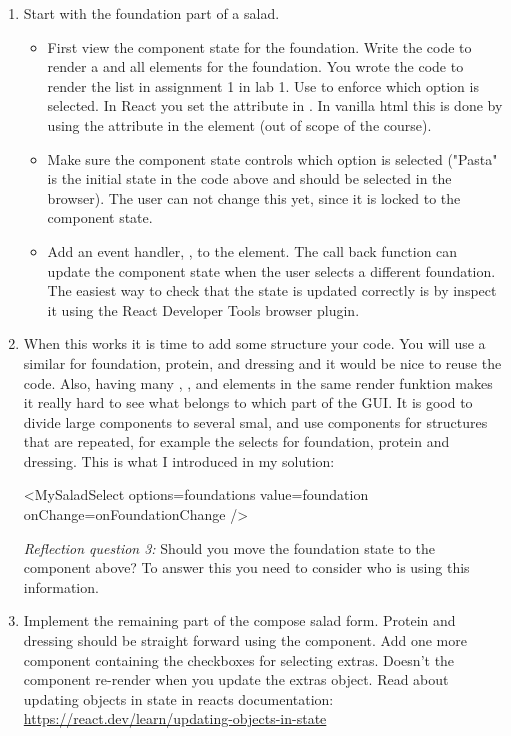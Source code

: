 \documentclass[fleqn, article, a4paper]{memoir}
\begin{document}
\begin{Assignments}
\begin{enumerate}
  \item Start with the foundation part of a salad. 
  \begin{itemize}
    \item First view the component state for the foundation. Write the code to render a  and all  elements for the foundation. You wrote the code to render the  list in assignment 1 in lab 1. Use  to enforce which option is selected. In React you set the  attribute in . In vanilla html this is done by using the  attribute in the  element (out of scope of the course).
    \item Make sure the component state controls which option is selected ("Pasta" is the initial state in the code above and should be selected in the browser). The user can not change this yet, since it is locked to the component state.
    \item Add an event handler, , to the  element. The call back function can update the component state when the user selects a different foundation. The easiest way to check that the state is updated correctly is by inspect it using the React Developer Tools browser plugin.
  \end{itemize}
  \item When this works it is time to add some structure your code. You will use a similar  for foundation, protein, and dressing and it would be nice to reuse the code. Also, having many , , and  elements in the same render funktion makes it really hard to see what belongs to which part of the GUI. It is good to divide large components to several smal, and use components for structures that are repeated, for example the selects for foundation, protein and dressing. This is what I introduced in my solution:
  \begin{Code}
  <MySaladSelect
      options={foundations}
      value={foundation}
      onChange={onFoundationChange}
  />
  \end{Code}
  \emph{Reflection question 3:} Should you move the foundation state to the  component above? To answer this you need to consider who is using this information.

\item Implement the remaining part of the compose salad form. Protein and dressing should be straight forward using the  component. Add one more component containing the checkboxes for selecting extras. Doesn't the component re-render when you update the extras object. Read about updating objects in state in reacts documentation: \url{https://react.dev/learn/updating-objects-in-state}


\end{enumerate}
\end{Assignments}
\end{document}
